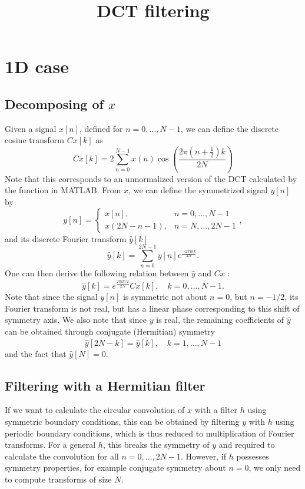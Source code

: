 \documentclass[twocolumn]{article}
\title{DCT filtering}
\begin{document}
	
\maketitle

\section{1D case}

\subsection{Decomposing of $x$}

Given a signal $x[n]$, defined for $n = 0,\ldots,N-1$, we can define the discrete cosine transform $Cx[k]$ as
\[
Cx[k] = 2\sum_{n=0}^{N-1}x(n)\cos\left(\frac{2\pi\left(n+\frac{1}{2}\right)k}{2N}\right)
\]
Note that this corresponds to an unnormalized version of the DCT calculated by  the  function in MATLAB. From $x$, we can define the symmetrized signal $y[n]$ by
\[
y[n] = \left\{\begin{array}{ll} x[n], & n=0,\ldots,N-1 \\ x(2N-n-1), & n = N,\ldots,2N-1\end{array}\right.,
\]
and its discrete Fourier transform $\hat{y}[k]$
\[
\hat{y}[k] = \sum_{n=0}^{2N-1}y[n]e^{\frac{-2\pi i n k}{2N}}.
\]
One can then derive the following relation between $\hat{y}$ and $Cx$ \cite{makhoul}:
\[
\hat{y}[k] = e^{\frac{2\pi i k/2}{2N}}Cx[k],\quad k=0,\ldots,N-1.
\]
Note that since the signal $y[n]$ is symmetric not about $n=0$, but $n=-1/2$, its Fourier transform is not real, but has a linear phase corresponding to this shift of symmetry axis. We also note that since $y$ is real, the remaining coefficients of $\hat{y}$ can be obtained through conjugate (Hermitian) symmetry
\[
\hat{y}[2N-k] = \overline{\hat{y}[k]},\quad k=1,\ldots,N-1
\]
and the fact that $\hat{y}[N] = 0$.

\subsection{Filtering with a Hermitian filter}

If we want to calculate the circular convolution of $x$ with a filter $h$ using symmetric boundary conditions, this can be obtained by filtering $y$ with $h$ using periodic boundary conditions, which is thus reduced to multiplication of Fourier transforms. For a general $h$, this breaks the symmetry of $y$ and required to calculate the convolution for all $n=0,\ldots,2N-1$. However, if $h$ possesses symmetry properties, for example conjugate symmetry about $n = 0$, we only need to compute transforms of size $N$.
\end{document}
